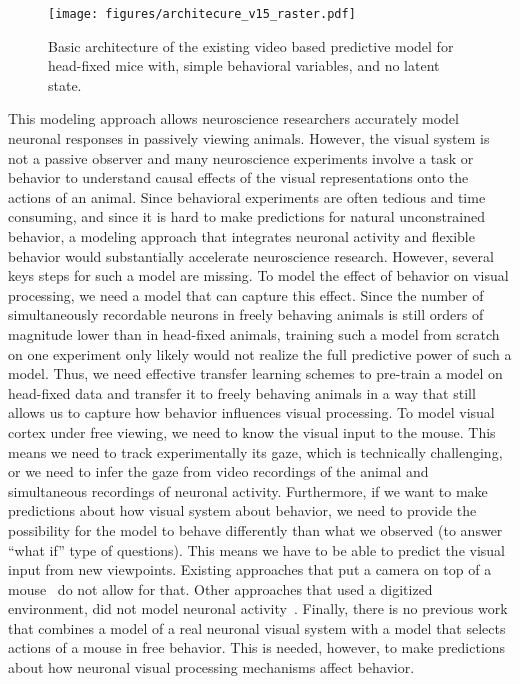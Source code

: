 \documentclass[B2,COG]{ercgrant}
\begin{document}
\begin{figure}
\texttt{[image: figures/architecure\_v15\_raster.pdf]}
\caption{Basic architecture of the existing video based predictive model for head-fixed mice with, simple behavioral variables, and no latent state.}
\label{fig:videomodel}
\end{figure}
This modeling approach allows neuroscience researchers accurately model neuronal responses in passively viewing animals. 
However, the visual system is not a passive observer and many neuroscience experiments involve a task or behavior to understand causal effects of the visual representations onto the actions of an animal. 
Since behavioral experiments are often tedious and time consuming, and since it is hard to make predictions for natural unconstrained behavior, a modeling approach that integrates neuronal activity and flexible behavior would substantially accelerate neuroscience research. 
However, several keys steps for such a model are missing. 
To model the effect of behavior on visual processing, we need a model that can capture this effect. 
Since the number of simultaneously recordable neurons in freely behaving animals is still orders of magnitude lower than in head-fixed animals, training such a model from scratch on one experiment only likely would not realize the full predictive power of such a model. 
Thus, we need effective transfer learning schemes to pre-train a model on head-fixed data and transfer it to freely behaving animals in a way that still allows us to capture how behavior influences visual processing. 
To model visual cortex under free viewing, we need to know the visual input to the mouse. 
This means we need to track experimentally its gaze, which is technically challenging, or we need to infer the gaze from video recordings of the animal and simultaneous recordings of neuronal activity. 
Furthermore, if we want to make predictions about how visual system about behavior, we need to provide the possibility for the model to behave differently than what we observed (to answer ``what if'' type of questions). 
This means we have to be able to predict the visual input from new viewpoints.
Existing approaches that put a camera on top of a mouse~\parencite{Parker2022-ac} do not allow for that. 
Other approaches that used a digitized environment, did not model neuronal activity~\parencite{Holmgren2021-jv}.
Finally, there is no previous work that combines a model of a real neuronal visual system with a model that selects actions of a mouse in free behavior. 
This is needed, however, to make predictions about how neuronal visual processing mechanisms affect behavior. 
\end{document}
